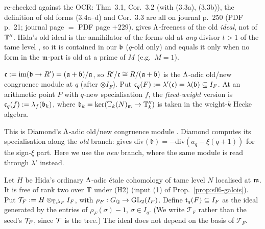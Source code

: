re-checked against the OCR: Thm~3.1, Cor.~3.2 (with (3.3a), (3.3b)), the definition of old forms (3.4a--d) and Cor.~3.3 are all on
journal p.~250 (PDF p.~21; journal page $=$ PDF page $+229$). \cite[Cor.~3.3, p.~250]{Hi86b} gives $\Lambda$-freeness of the old
\emph{ideal}, not of $\mathbb{T}''$. Hida's old ideal is the annihilator of the forms old at \emph{any} divisor $t>1$ of the tame level
\cite[(3.4a--d), p.~250]{Hi86b}, so it is contained in our $\mathfrak{b}$ ($q$-old only) and equals it only when no form in the $\mathfrak{m}$-part is old at a
prime of $M$ (e.g.\ $M=1$).  

\begin{definition}\label{def:s06-ctam}
$\mathfrak{c}:=\mathrm{im}(\mathfrak{b}\to R')=(\mathfrak{a}+\mathfrak{b})/\mathfrak{a}$, so $R'/\mathfrak{c}\cong R/(\mathfrak{a}+\mathfrak{b})$ is the $\Lambda$-adic old/new congruence module at $q$
(after $\otimes I_F$). Put $\mathfrak{c}_q(F):=\lambda'(\mathfrak{c})=\lambda(\mathfrak{b})\subseteq I_F$. At an arithmetic point $P$ with $q$-new
specialisation $f$, the \emph{fixed-weight} version is $\mathfrak{c}_q(f):=\lambda_f(\mathfrak{b}_k)$, where $\mathfrak{b}_k=\ker(\mathbb{T}_k(N)_{\mathfrak{m}}\to\mathbb{T}''_k)$ is taken
in the weight-$k$ Hecke algebra. 
\end{definition}
\noindent This is Diamond's $\Lambda$-adic old/new congruence module \cite{Dia89}. Diamond computes its specialisation along the \emph{old}
branch: \cite[Thm~6B, p.~80]{Dia89}
 \stcited{} gives
$\mathrm{div}(\mathfrak b)=-\mathrm{div}(a_q-\xi(q+1))$ for the sign-$\xi$ part. Here we use the \emph{new} branch, where the same
module is read through $\lambda'$ instead.

\begin{definition}\label{def:s06-tam}
Let $H$ be Hida's ordinary $\Lambda$-adic étale cohomology of tame level $N$ localised at $\mathfrak{m}$. It is free of rank two over $\mathbb{T}$
under (H2) (input (1) of Prop.~\ref{prop:s06-galois}). Put $\mathcal T_F:=H\otimes_{\mathbb{T},\lambda_F}I_F$, with
$\rho_F:G_{\mathbb{Q}}\to\mathrm{GL}_2(I_F)$. Define $\mathfrak{t}_q(F)\subseteq I_F$ as the ideal generated by the entries of $\rho_F(\sigma)-1$,
$\sigma\in I_q$. (We write $\mathcal T_F$ rather than the seed's $\mathcal{T}_F$, since $\mathcal{T}$ is the tree.) The ideal does not depend on
the basis of $\mathcal T_F$. 
\end{definition}

